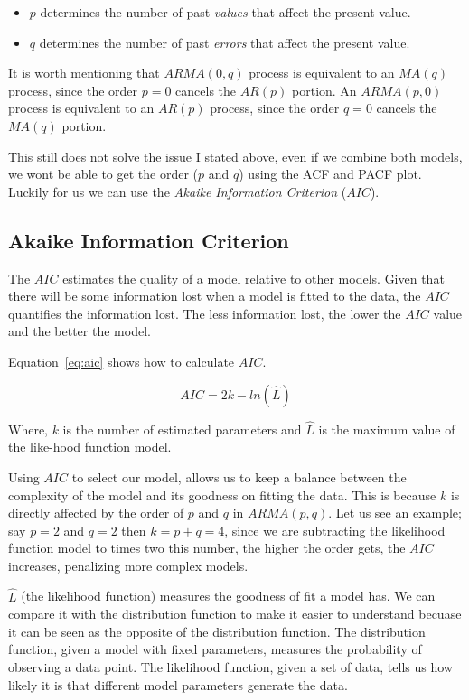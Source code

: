 \documentclass[journal]{IEEEtran}
\begin{document}
\begin{itemize}
    \item $p$ determines the number of past \emph{values} that affect the
        present value.
    \item $q$ determines the number of past \emph{errors} that affect the
        present value.
\end{itemize}

It is worth mentioning that $ARMA(0,q)$ process is equivalent to an $MA(q)$
process, since the order $p = 0$ cancels the $AR(p)$ portion. An $ARMA(p,0)$
process is equivalent to an $AR(p)$ process, since the order $q = 0$ cancels
the $MA(q)$ portion.

This still does not solve the issue I stated above, even if we combine both
models, we wont be able to get the order ($p$ and $q$) using the ACF and PACF
plot. Luckily for us we can use the \emph{Akaike Information Criterion}
($AIC$).

\subsection{Akaike Information Criterion}\label{sub:aic}

The $AIC$ estimates the quality of a model relative to other models.  Given
that there will be some information lost when a model is fitted to the data,
the $AIC$ quantifies the information lost. The less information lost, the
lower the $AIC$ value and the better the model.

Equation~\ref{eq:aic} shows how to calculate $AIC$.

\begin{equation}
    AIC = 2k - ln(\hat{L})
    \label{eq:aic}
\end{equation}

Where, $k$ is the number of estimated parameters and $\hat{L}$ is the maximum
value of the like-hood function model.

Using $AIC$ to select our model, allows us to keep a balance between the
complexity of the model and its goodness on fitting the data. This is because
$k$ is directly affected by the order of $p$ and $q$ in $ARMA(p,q)$. Let us
see an example; say $p = 2$ and $q=2$ then $k = p + q = 4$, since we are
subtracting the likelihood function model to times two this number, the
higher the order gets, the $AIC$ increases, penalizing more complex models.

$\hat{L}$ (the likelihood function) measures the goodness of fit a model has.
We can compare it with the distribution function to make it easier to
understand becuase it can be seen as the opposite of the distribution function.
The distribution function, given a model with fixed parameters, measures the
probability of observing a data point. The likelihood function, given a set of
data, tells us  how likely it is that different model parameters generate the
data.
\end{document}
